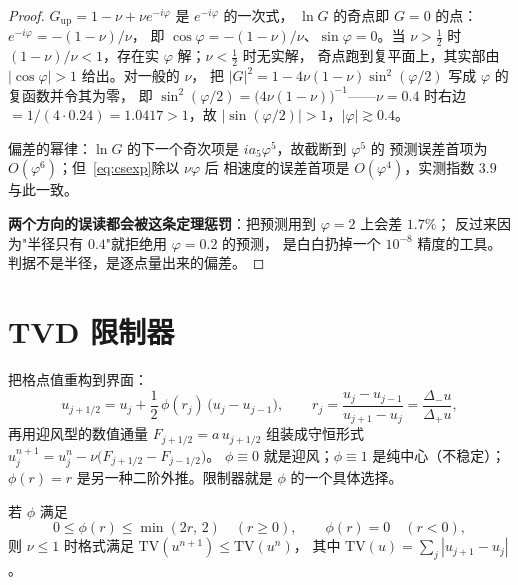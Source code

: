 \begin{proof}
$G_{\text{up}}=1-\nu+\nu e^{-i\varphi}$ 是 $e^{-i\varphi}$ 的一次式，
$\ln G$ 的奇点即 $G=0$ 的点：$e^{-i\varphi}=-(1-\nu)/\nu$，
即 $\cos\varphi=-(1-\nu)/\nu$、$\sin\varphi=0$。当 $\nu>\tfrac12$ 时
$(1-\nu)/\nu<1$，存在实 $\varphi$ 解；$\nu<\tfrac12$ 时无实解，
奇点跑到复平面上，其实部由 $|\cos\varphi|>1$ 给出。对一般的 $\nu$，
把 $|G|^2=1-4\nu(1-\nu)\sin^2(\varphi/2)$ 写成 $\varphi$ 的复函数并令其为零，
即 $\sin^2(\varphi/2)=\bigl(4\nu(1-\nu)\bigr)^{-1}$——$\nu=0.4$ 时右边
$=1/(4\cdot0.24)=1.0417>1$，故 $|\sin(\varphi/2)|>1$，$|\varphi|\gtrsim0.4$。

偏差的幂律：$\ln G$ 的下一个奇次项是 $ia_5\varphi^5$，故截断到 $\varphi^5$ 的
预测误差首项为 $O(\varphi^6)$；但~\eqref{eq:csexp}除以 $\nu\varphi$ 后
相速度的误差首项是 $O(\varphi^4)$，实测指数 $3.9$ 与此一致。

\textbf{两个方向的误读都会被这条定理惩罚}：把预测用到 $\varphi=2$ 上会差 $1.7\%$；
反过来因为"半径只有 $0.4$"就拒绝用 $\varphi=0.2$ 的预测，
是白白扔掉一个 $10^{-8}$ 精度的工具。判据不是半径，是逐点量出来的偏差。
\end{proof}

\section{TVD 限制器}
\label{sec:tvd}

\begin{definition}
\label{def:muscl}
把格点值重构到界面：
\begin{equation}
  u_{j+1/2}=u_j+\frac12\,\phi(r_j)\,\bigl(u_j-u_{j-1}\bigr),\qquad
  r_j=\frac{u_j-u_{j-1}}{u_{j+1}-u_j}=\frac{\Delta_-u}{\Delta_+u},
  \label{eq:muscl}
\end{equation}
再用迎风型的数值通量 $F_{j+1/2}=a\,u_{j+1/2}$ 组装成守恒形式
$u_j^{n+1}=u_j^n-\nu\bigl(F_{j+1/2}-F_{j-1/2}\bigr)$。
$\phi\equiv0$ 就是迎风；$\phi\equiv1$ 是纯中心（不稳定）；
$\phi(r)=r$ 是另一种二阶外推。限制器就是 $\phi$ 的一个具体选择。
\end{definition}

\begin{theorem}
\label{thm:sweby}
若 $\phi$ 满足
\begin{equation}
  0\le\phi(r)\le\min(2r,\,2)\quad(r\ge0),\qquad \phi(r)=0\quad(r<0),
  \label{eq:sweby}
\end{equation}
则 $\nu\le1$ 时格式满足 $\mathrm{TV}(u^{n+1})\le\mathrm{TV}(u^n)$，
其中 $\mathrm{TV}(u)=\sum_j|u_{j+1}-u_j|$。
\end{theorem}

